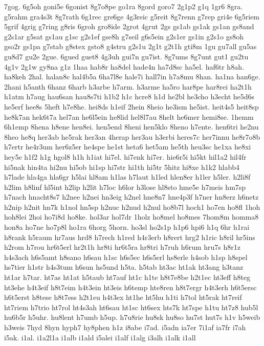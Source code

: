 {7gog.
6g5oh
goni5e
6gonist
8g7o8pe
go1ra
8gord
goro7
2g1p2
g1q
1gr6
8gra.
g5rahm
gra4s3t
8g7rath
6g1rec
gre6ge
4g3reic
g5reit
8g7renn
g7rep
gri4e
6g5riem
5grif
4grig
g7ring
g8ris
6groh
gro8ide
2grot
4grut
2gs
gs1ab
gs1ak
gs1an
gs8and
g2s1ar
g5sat
gs1au
g1sc
g2s1ef
gse8h
g7seil
g6s5ein
g2s1er
gs1in
g2s1o
gs8oh
gso2r
gs1pa
g7stab
g8stex
gsto8
g4stru
g2s1u
2g1t
g2t1h
gti8m
1gu
gu7all
gu5as
gu8d7
gu2e
2gue.
6gued
guet8
4g3uh
gui7n
gu7ist.
8g7ums
8g7unt
gut1
gu2tu
4g1v
2g1w
gy8na
g1z
1haa
hab8r
ha8del
hade4n
ha7d8sc
ha5el.
haf6tr
h8ah.
ha8keh
2hal.
halan8c
hal4b5a
6ha7l8e
hale7i
hall7in
h7a8mu
8han.
ha1na
han6ge.
2hani
h5anth
6hanz
6harb
h3arbe
h7arm.
h3arme
ha5ro
har8pe
har8rei
ha2t1h
h1atm
h7aug
hau6san
hau8s7ti
h1b2
h1c
hcre8
h1d
he2bl
he3cho
h3echt
he5d6s
he5erf
hee8s
5heft
h7e8he.
hei8ds
h1eif
2hein
8heio
he3ism
he5ist.
heit4s5
heit8sp
he8k7an
hek6t7a
hel7an
he6l5ein
he8lid
hel8l7au
8helt
he6mer
hemi8se.
1hemm
6h1emp
8hena
h8ene
hen8ei.
hen5end
8heni
hen5klo
8heno
h7ente.
hen6tri
he2nu
8heo
he8q
her3ab
he5rak
her3an
4herap
her3au
h3erbi
heres7c
her7innu
he8r7o8b
h7ertr
he4r3um
her6z5er
he4spe
he1st
heta6
het5am
he5th
heu3sc
he1xa
he8xi
hey5e
h1f2
h1g
hgol8
h1h
h1iat
hi7el.
hi7enk
hi7er.
hie6r5i
hi5kt
hil1a2
hil4fr
hi5nak
hin4ta
hi2nu
hi5ob
hi1sp
hi7str
hi1th
hi5tr
5hitz
hi8xe
h1k2
hlabb4
h7lade
hla4ga
hla6gr
h5lai
hl8am
h1las
h7laut
h1led
hlen8er
h1ler
h5ler.
h2li8f
h2lim
h8linf
hl5int
h2lip
h2lit
h7loc
h6lor
h3lose
hl8sto
hme5e
h7meis
hm7sp
h7nach
hnacht8s7
h2nee
h2nei
hn3eig
h2nel
hne8n7
hne4p3f
h7ner
hn8erz
h6netz
h2nip
h2nit
hn7k
h1nol
hn5sp
h2nuc
h2nud
h2nul
ho8b7l
hoch1
ho7en
ho8fl
1hoh
hoh8lei
2hoi
ho7i8d
ho8ke.
hol3ar
hol7dr
1holz
ho8mel
ho8mes
7hom8m
homma8
hon8a
ho7ne
ho7p8l
ho1ra
6horg
5horn.
ho3sl
ho2s1p
h1p6
hpi6
h1q
6hr
h1rai
h8rank
h5raum
hr7aus
hrd8
h7rech
h1red
h4r3erb
h8rert
hrg2
h1ric
h8ril
hr5ins
h2rom
h7rou
hr6t5erl
hr2t1h
hr8ti
hr6t5ra
hr8tri
h7ruh
h6rum
hru7s
h8r1z
h4s3ach
h6s5amt
h8sano
h6sau
h1sc
h6s5ec
h6s5erl
hs8erle
h4sob
h1sp
h8spel
hs7tier
h1str
h4s3tum
h6sun
hs5und
h5ta.
h5tab
ht3ac
ht1ak
ht3ang
h3tanz
ht1ar
h7tar.
ht7as
ht1at
h5taub
ht7auf
ht1c
h1te
h8t7e8be
h2t1ec
ht3eff
h8teg
ht3ehe
h4t3eif
h8t7eim
h4t3ein
ht3eis
h6temp
hte8ren
h8t7ergr
h4t3erh
h6t5ersc
h6t5erst
h8tese
h8t7ess
h2t1eu
h4t3ex
ht1he
ht5hu
h1ti
h7tol
ht5rak
ht7reif
ht7riem
h7trio
ht7rol
ht4s3ah
ht6sau
ht1sc
ht6sex
hts7k
ht7spe
h1tu
ht7z8
hub5l
hu6b5r
h5uhr.
hu8lent
h7umb
h5up.
h7u8rie
hu8sk
hu8so
hu7st
hut7s
h1v
h5weib
h3weis
7hyd
8hyn
hyph7
hy8phen
h1z
i8abe
i7ad.
i5adn
ia7er
7i1af
ia7fr
i7ah
i5ak.
i1al.
i1a2l1a
i1alb
i1ald
i5alei
i1alf
i1alg
i3alh
i1alk
i1all
}

